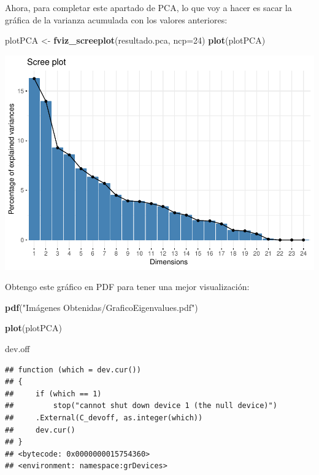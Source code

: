 \documentclass[]{article}
\newenvironment{Shaded}{\begin{snugshade}}{\end{snugshade}}
\newcommand{\KeywordTok}[1]{\textcolor[rgb]{0.13,0.29,0.53}{\textbf{#1}}}
\newcommand{\DataTypeTok}[1]{\textcolor[rgb]{0.13,0.29,0.53}{#1}}
\newcommand{\DecValTok}[1]{\textcolor[rgb]{0.00,0.00,0.81}{#1}}
\newcommand{\StringTok}[1]{\textcolor[rgb]{0.31,0.60,0.02}{#1}}
\newcommand{\NormalTok}[1]{#1}
\begin{document}
Ahora, para completar este apartado de PCA, lo que voy a hacer es sacar
la gráfica de la varianza acumulada con los valores anteriores:

\begin{Shaded}
\begin{Highlighting}[]
\NormalTok{plotPCA <-}\StringTok{ }\KeywordTok{fviz_screeplot}\NormalTok{(resultado.pca, }\DataTypeTok{ncp=}\DecValTok{24}\NormalTok{)}
\KeywordTok{plot}\NormalTok{(plotPCA)}
\end{Highlighting}
\end{Shaded}

\includegraphics{codigo_files/figure-latex/PCA_eigenvalues_graph-1.pdf}

Obtengo este gráfico en PDF para tener una mejor visualización:

\begin{Shaded}
\begin{Highlighting}[]
\KeywordTok{pdf}\NormalTok{(}\StringTok{"Imágenes Obtenidas/GraficoEigenvalues.pdf"}\NormalTok{)}

\KeywordTok{plot}\NormalTok{(plotPCA)}

\NormalTok{dev.off}
\end{Highlighting}
\end{Shaded}

\begin{verbatim}
## function (which = dev.cur()) 
## {
##     if (which == 1) 
##         stop("cannot shut down device 1 (the null device)")
##     .External(C_devoff, as.integer(which))
##     dev.cur()
## }
## <bytecode: 0x0000000015754360>
## <environment: namespace:grDevices>
\end{verbatim}
\end{document}
